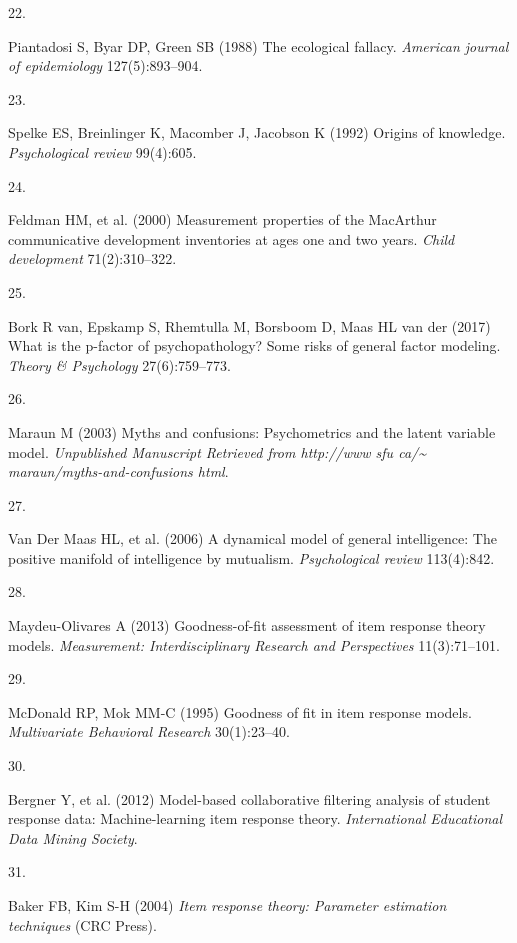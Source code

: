 \documentclass[man]{apa7}
\newlength{\csllabelwidth}
\newcommand{\CSLLeftMargin}[1]{\parbox[t]{\csllabelwidth}{#1}}
\begin{document}
\leavevmode\hypertarget{ref-piantadosi1988ecological}{}%
\CSLLeftMargin{22. }Piantadosi S, Byar DP, Green SB (1988) The ecological
fallacy. \emph{American journal of epidemiology} 127(5):893--904.

\leavevmode\hypertarget{ref-spelke1992origins}{}%
\CSLLeftMargin{23. }Spelke ES, Breinlinger K, Macomber J, Jacobson K (1992)
Origins of knowledge. \emph{Psychological review} 99(4):605.

\leavevmode\hypertarget{ref-feldman2000measurement}{}%
\CSLLeftMargin{24. }Feldman HM, et al. (2000) Measurement properties of the
MacArthur communicative development inventories at ages one and two
years. \emph{Child development} 71(2):310--322.

\leavevmode\hypertarget{ref-van2017p}{}%
\CSLLeftMargin{25. }Bork R van, Epskamp S, Rhemtulla M, Borsboom D, Maas HL
van der (2017) What is the p-factor of psychopathology? Some risks of
general factor modeling. \emph{Theory \& Psychology} 27(6):759--773.

\leavevmode\hypertarget{ref-maraun2003myths}{}%
\CSLLeftMargin{26. }Maraun M (2003) Myths and confusions: Psychometrics and
the latent variable model. \emph{Unpublished Manuscript Retrieved from
http://www sfu ca/\textasciitilde{} maraun/myths-and-confusions html}.

\leavevmode\hypertarget{ref-van2006dynamical}{}%
\CSLLeftMargin{27. }Van Der Maas HL, et al. (2006) A dynamical model of
general intelligence: The positive manifold of intelligence by
mutualism. \emph{Psychological review} 113(4):842.

\leavevmode\hypertarget{ref-maydeu2013goodness}{}%
\CSLLeftMargin{28. }Maydeu-Olivares A (2013) Goodness-of-fit assessment of
item response theory models. \emph{Measurement: Interdisciplinary
Research and Perspectives} 11(3):71--101.

\leavevmode\hypertarget{ref-mcdonald1995goodness}{}%
\CSLLeftMargin{29. }McDonald RP, Mok MM-C (1995) Goodness of fit in item
response models. \emph{Multivariate Behavioral Research} 30(1):23--40.

\leavevmode\hypertarget{ref-bergner2012model}{}%
\CSLLeftMargin{30. }Bergner Y, et al. (2012) Model-based collaborative
filtering analysis of student response data: Machine-learning item
response theory. \emph{International Educational Data Mining Society}.

\leavevmode\hypertarget{ref-baker2004item}{}%
\CSLLeftMargin{31. }Baker FB, Kim S-H (2004) \emph{Item response theory:
Parameter estimation techniques} (CRC Press).
\end{document}
